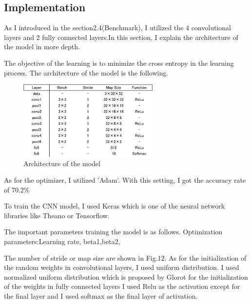 \subsection{Implementation}


As I introduced in the section2.4(Benchmark), I utilized the 4 convolutional layers and 2 fully connected layers.In this section, I explain the architecture of the model in more depth.

The objective of the learning is to minimize the cross entropy in the learning process.
The architecture of the model is the following.

 \begin{figure}[H]

	\begin{center}
	\includegraphics[width=7cm]{picture/layer_architecture.png}
	\caption{Architecture of the model}
	\end{center}
	\label{fig:9}

\end{figure}


As for the optimizer, I utilized 'Adam'.
With this setting, I got the accuracy rate of 70.2\%

To train the CNN model, I used Keras which is one of the neural network libraries like Theano or Tensorflow.

The important parameters training the model is as follows.
Optimization parameters:Learning rate, beta1,beta2, 

The number of stride or map size are shown in Fig.12.
As for the initialization of the random weights in convolutional layers, I used uniform distribution.
I used normalized uniform distribution which is proposed by Glorot\cite{Glorot} for the initialization of the weights in fully connected layers
I used Relu as the activation except for the final layer and I used softmax as the final layer of activation.